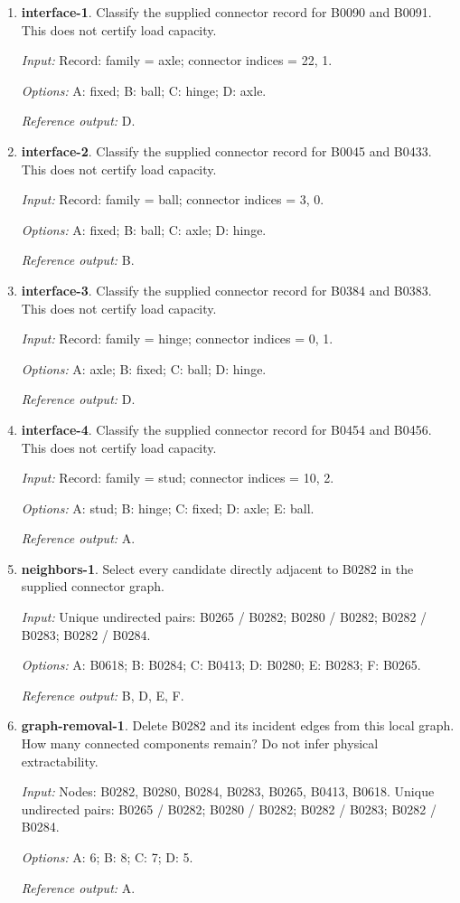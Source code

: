 \begin{enumerate}
\item \textbf{interface-1}. Classify the supplied connector record for B0090 and B0091. This does not certify load capacity.\par {\small \textit{Input:} Record: family = axle; connector indices = 22, 1. \par\textit{Options:} A: fixed; B: ball; C: hinge; D: axle. \par\textit{Reference output:} D.}
\item \textbf{interface-2}. Classify the supplied connector record for B0045 and B0433. This does not certify load capacity.\par {\small \textit{Input:} Record: family = ball; connector indices = 3, 0. \par\textit{Options:} A: fixed; B: ball; C: axle; D: hinge. \par\textit{Reference output:} B.}
\item \textbf{interface-3}. Classify the supplied connector record for B0384 and B0383. This does not certify load capacity.\par {\small \textit{Input:} Record: family = hinge; connector indices = 0, 1. \par\textit{Options:} A: axle; B: fixed; C: ball; D: hinge. \par\textit{Reference output:} D.}
\item \textbf{interface-4}. Classify the supplied connector record for B0454 and B0456. This does not certify load capacity.\par {\small \textit{Input:} Record: family = stud; connector indices = 10, 2. \par\textit{Options:} A: stud; B: hinge; C: fixed; D: axle; E: ball. \par\textit{Reference output:} A.}
\item \textbf{neighbors-1}. Select every candidate directly adjacent to B0282 in the supplied connector graph.\par {\small \textit{Input:} Unique undirected pairs: B0265 / B0282; B0280 / B0282; B0282 / B0283; B0282 / B0284. \par\textit{Options:} A: B0618; B: B0284; C: B0413; D: B0280; E: B0283; F: B0265. \par\textit{Reference output:} B, D, E, F.}
\item \textbf{graph-removal-1}. Delete B0282 and its incident edges from this local graph. How many connected components remain? Do not infer physical extractability.\par {\small \textit{Input:} Nodes: B0282, B0280, B0284, B0283, B0265, B0413, B0618. Unique undirected pairs: B0265 / B0282; B0280 / B0282; B0282 / B0283; B0282 / B0284. \par\textit{Options:} A: 6; B: 8; C: 7; D: 5. \par\textit{Reference output:} A.}

\end{enumerate}
